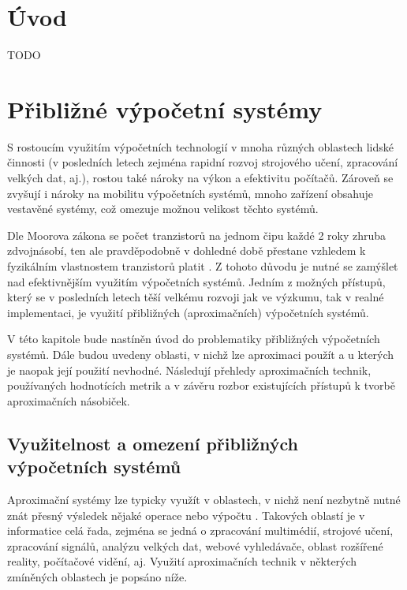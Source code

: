 
%

\chapter{Úvod}
TODO

\chapter{Přibližné výpočetní systémy} 
\label{acs}
S rostoucím využitím výpočetních technologií v mnoha různých oblastech lidské činnosti (v posledních letech zejména rapidní rozvoj strojového učení, zpracování velkých dat, aj.), rostou také nároky na výkon a efektivitu počítačů. Zároveň se zvyšují i nároky na mobilitu výpočetních systémů, mnoho zařízení obsahuje vestavěné systémy, což omezuje možnou velikost těchto systémů.

Dle Moorova zákona se počet tranzistorů na jednom čipu každé 2 roky zhruba zdvojnásobí, ten ale pravděpodobně v dohledné době přestane vzhledem k fyzikálním vlastnostem tranzistorů platit \cite{moore}. Z tohoto důvodu je nutné se zamýšlet nad efektivnějším využitím výpočetních systémů.
Jedním z možných přístupů, který se v posledních letech těší velkému rozvoji jak ve výzkumu, tak v realné implementaci, je využití přibližných (aproximačních) výpočetních systémů.

V této kapitole bude nastíněn úvod do problematiky přibližných výpočetních systémů. Dále budou uvedeny oblasti, v nichž lze aproximaci použít a u kterých je naopak její použití nevhodné. Následují přehledy aproximačních technik, používaných hodnotících metrik a v závěru rozbor existujících přístupů k tvorbě aproximačních násobiček.

\section{Využitelnost a omezení přibližných výpočetních systémů}
Aproximační systémy lze typicky využít v oblastech, v nichž není nezbytně nutné znát přesný výsledek nějaké operace nebo výpočtu \cite{emerging_paradigm}. Takových oblastí je v informatice celá řada, zejména se jedná o zpracování multimédií, strojové učení, zpracování signálů, analýzu velkých dat, webové vyhledávače, oblast rozšířené reality, počítačové vidění, aj. Využití aproximačních technik v některých zmíněných oblastech je popsáno níže.

